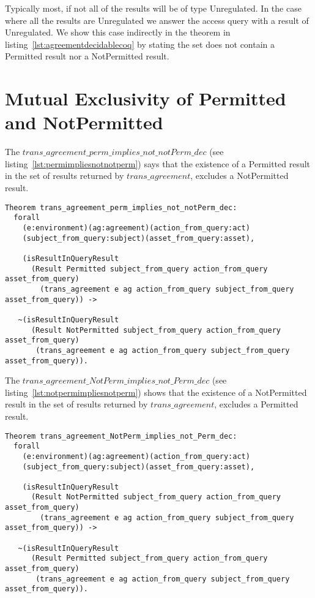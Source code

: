 Typically most, if not all of the results will be of type Unregulated. In the case where all the results are Unregulated we answer the access query with a result of Unregulated. We show this case indirectly in the theorem in listing~\ref{lst:agreementdecidablecoq} by stating the set does not contain a Permitted result nor a NotPermitted result. 

\section{Mutual Exclusivity of Permitted and NotPermitted}

The $trans\_agreement\_perm\_implies\_not\_notPerm\_dec$ (see listing~\ref{lst:permimpliesnotnotperm}) says that the existence of a Permitted result in the set of results returned by $trans\_agreement$, excludes a NotPermitted result.


\begin{lstlisting}
Theorem trans_agreement_perm_implies_not_notPerm_dec:
  forall
    (e:environment)(ag:agreement)(action_from_query:act)
    (subject_from_query:subject)(asset_from_query:asset),

    (isResultInQueryResult 
      (Result Permitted subject_from_query action_from_query asset_from_query)
        (trans_agreement e ag action_from_query subject_from_query asset_from_query)) ->

   ~(isResultInQueryResult 
      (Result NotPermitted subject_from_query action_from_query asset_from_query)
       (trans_agreement e ag action_from_query subject_from_query asset_from_query)).
\end{lstlisting}


The  $trans\_agreement\_NotPerm\_implies\_not\_Perm\_dec$ (see listing~\ref{lst:notpermimpliesnotperm}) shows that the existence of a NotPermitted result in the set of results returned by $trans\_agreement$, excludes a Permitted result.

\begin{lstlisting}
Theorem trans_agreement_NotPerm_implies_not_Perm_dec:
  forall
    (e:environment)(ag:agreement)(action_from_query:act)
    (subject_from_query:subject)(asset_from_query:asset),

    (isResultInQueryResult 
      (Result NotPermitted subject_from_query action_from_query asset_from_query)
        (trans_agreement e ag action_from_query subject_from_query asset_from_query)) ->

   ~(isResultInQueryResult 
      (Result Permitted subject_from_query action_from_query asset_from_query)
       (trans_agreement e ag action_from_query subject_from_query asset_from_query)).
\end{lstlisting}

